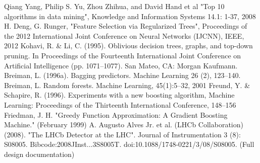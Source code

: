 \documentclass[twoside]{article}
\begin{document}
\begin{multicols}{2}


\begin{thebibliography}{99} %

\bibitem 
Qiang Yang, Philip S. Yu, Zhou Zhihua, and David Hand et al "Top 10 algorithms in data mining", Knowledge and Information Systems 14.1: 1-37, 2008
\bibitem 
H. Deng, G. Runger, "Feature Selection via Regularized Trees", Proceedings of the 2012 International Joint Conference on Neural Networks (IJCNN), IEEE, 2012
\bibitem 
Kohavi, R. \& Li, C. (1995). Oblivious decision trees, graphs, and top-down pruning. In Proceedings of the Fourteenth International Joint Conference on Artificial Intelligence (pp. 1071–1077). San Mateo, CA: Morgan Kaufmann.
\bibitem 
Breiman, L. (1996a). Bagging predictors. Machine Learning 26 (2), 123–140.
\bibitem 
Breiman, L. Random forests. Machine Learning, 45(1):5–32, 2001
\bibitem 
Freund, Y. \& Schapire, R. (1996). Experiments with a new boosting algorithm, Machine Learning: Proceedings of the Thirteenth International Conference, 148–156
\bibitem 
Friedman, J. H. "Greedy Function Approximation: A Gradient Boosting Machine." (February 1999)
\bibitem A. Augusto Alves Jr. et al. (LHCb Collaboration) (2008). "The LHCb Detector at the LHC". Journal of Instrumentation 3 (8): S08005. Bibcode:2008JInst...3S8005T. doi:10.1088/1748-0221/3/08/S08005. (Full design documentation)

 
\end{thebibliography}


\end{multicols}
\end{document}
